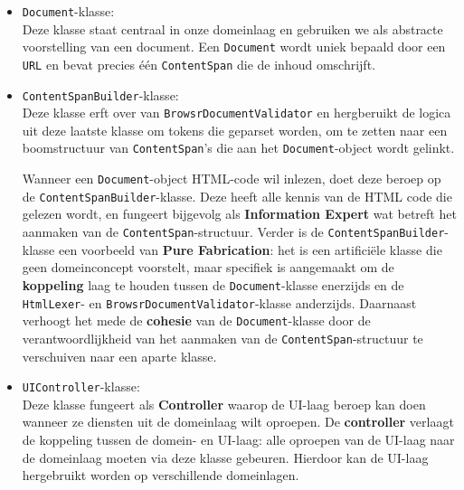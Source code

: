 \documentclass[12pt]{article}
\begin{document}
\begin{itemize}
	\item \texttt{Document}-klasse:\\
	Deze klasse staat centraal in onze domeinlaag en gebruiken we als abstracte voorstelling van een document. Een \texttt{Document} wordt uniek bepaald door een \texttt{URL} en bevat precies één \texttt{ContentSpan} die de inhoud omschrijft.
	
	\item \texttt{ContentSpanBuilder}-klasse:\\
	Deze klasse erft over van \texttt{BrowsrDocumentValidator} en hergberuikt de logica uit deze laatste klasse om tokens die geparset worden, om te zetten naar een boomstructuur van \texttt{ContentSpan}'s die aan het \texttt{Document}-object wordt gelinkt.
	
	Wanneer een \texttt{Document}-object HTML-code wil inlezen, doet deze beroep op de \texttt{ContentSpanBuilder}-klasse. Deze heeft alle kennis van de HTML code die gelezen wordt, en fungeert bijgevolg als \textbf{Information Expert} wat betreft het aanmaken van de \texttt{ContentSpan}-structuur. Verder is de \texttt{ContentSpanBuilder}-klasse een voorbeeld van \textbf{Pure Fabrication}: het is een artificiële klasse die geen domeinconcept voorstelt, maar specifiek is aangemaakt om de \textbf{koppeling} laag te houden tussen de \texttt{Document}-klasse enerzijds en de \texttt{HtmlLexer}- en \texttt{BrowsrDocumentValidator}-klasse anderzijds. Daarnaast verhoogt het mede de \textbf{cohesie} van de \texttt{Document}-klasse door de verantwoordlijkheid van het aanmaken van de \texttt{ContentSpan}-structuur te verschuiven naar een aparte klasse.
	
	\item \texttt{UIController}-klasse:\\
	Deze klasse fungeert als \textbf{Controller} waarop de UI-laag beroep kan doen wanneer ze diensten uit de domeinlaag wilt oproepen. De \textbf{controller} verlaagt de koppeling tussen de domein- en UI-laag: alle oproepen van de UI-laag naar de domeinlaag moeten via deze klasse gebeuren. Hierdoor kan de UI-laag hergebruikt worden op verschillende domeinlagen.
	

\end{itemize}
\end{document}
